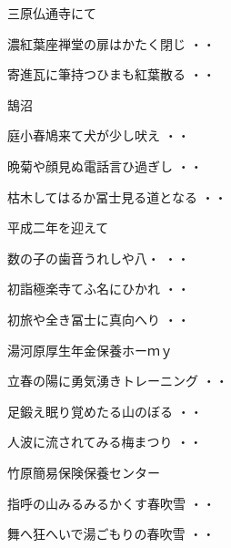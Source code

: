 \vspace{0.4cm}
三原仏通寺にて
\begin{shiika}濃紅葉座禅堂の扉はかたく閉じ
\hfill{・・}\end{shiika}
\begin{shiika}寄進瓦に筆持つひまも紅葉散る
\hfill{・・}\end{shiika}
\vspace{0.4cm}
鵠沼
\begin{shiika}庭小春鳩来て犬が少し吠え
\hfill{・・}\end{shiika}
\begin{shiika}晩菊や顔見ぬ電話言ひ過ぎし
\hfill{・・}\end{shiika}
\begin{shiika}枯木してはるか冨士見る道となる
\hfill{・・}\end{shiika}
\vspace{0.4cm}
平成二年を迎えて
\begin{shiika}数の子の歯音うれしや八・
\hfill{・・}\end{shiika}
\begin{shiika}初詣極楽寺てふ名にひかれ
\hfill{・・}\end{shiika}
\begin{shiika}初旅や全き冨士に真向へり
\hfill{・・}\end{shiika}
\vspace{0.4cm}
湯河原厚生年金保養ホーｍｙ
\begin{shiika}立春の陽に勇気湧きトレーニング
\hfill{・・}\end{shiika}
\begin{shiika}足鍛え眠り覚めたる山のぼる
\hfill{・・}\end{shiika}
\begin{shiika}人波に流されてみる梅まつり
\hfill{・・}\end{shiika}
\vspace{0.4cm}
竹原簡易保険保養センター
\begin{shiika}指呼の山みるみるかくす春吹雪
\hfill{・・}\end{shiika}
\begin{shiika}舞へ狂へいで湯ごもりの春吹雪
\hfill{・・}\end{shiika}
